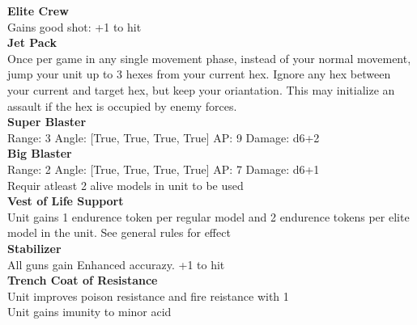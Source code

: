 {\bf Elite Crew } \\

Gains good shot: +1 to hit\\ 





{\bf Jet Pack } \\

Once per game in any single movement phase, instead of your normal movement, jump your unit up to 3 hexes from your current hex. Ignore any hex between your current and target hex, but keep your oriantation. This may initialize an assault if the hex is occupied by enemy forces.\\ 





{\bf Super Blaster } \\



Range: 3  Angle: [True, True, True, True] AP: 9 Damage: d6+2 \\




{\bf Big Blaster } \\



Range: 2  Angle: [True, True, True, True] AP: 7 Damage: d6+1 \\
Requir atleast 2 alive models in unit to be used\\ 




{\bf Vest of Life Support } \\

Unit gains 1 endurence token per regular model  and 2 endurence tokens per elite model in the unit. See general rules for effect\\ 





{\bf Stabilizer } \\

All guns gain Enhanced accurazy. +1 to hit\\ 





{\bf Trench Coat of Resistance } \\

Unit improves poison resistance and fire reistance with 1\\ 
Unit gains imunity to minor acid\\ 





